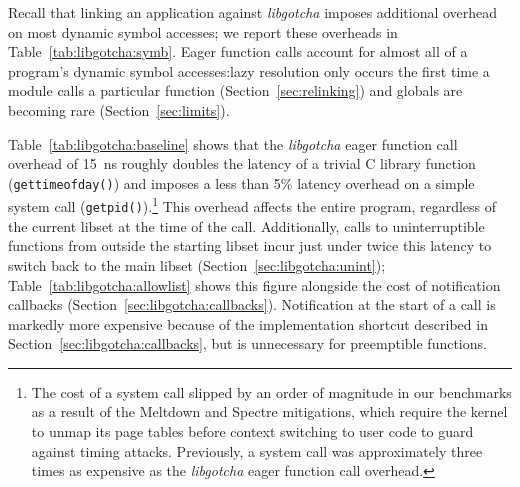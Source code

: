 Recall that linking an application against \textit{libgotcha} imposes additional
overhead on most dynamic symbol accesses; we report these overheads in
Table~\ref{tab:libgotcha:symb}.  Eager function calls account for almost all of a
program's dynamic symbol accesses:\@ lazy resolution only occurs the first
time a module calls a particular function (Section~\ref{sec:relinking}) and globals
are becoming rare (Section~\ref{sec:limits}).

Table~\ref{tab:libgotcha:baseline} shows that the \textit{libgotcha} eager function
call overhead of 15~ns roughly doubles the latency of a trivial C library function
(\texttt{gettimeofday()}) and imposes a less than 5\% latency overhead
on a simple system call (\texttt{getpid()}).\footnote{The cost of a system call
slipped by an order of magnitude in our benchmarks as a result of the Meltdown and
Spectre mitigations, which require the kernel to unmap its page tables before context
switching to user code to guard against timing attacks.  Previously, a system call
was approximately three times as expensive as the \textit{libgotcha} eager function
call overhead.}  This overhead affects the entire program, regardless of the
current libset at the time of the call.  Additionally, calls to
uninterruptible functions from outside the starting libset incur just under twice
this latency to switch back to the main libset
(Section~\ref{sec:libgotcha:unint}); Table~\ref{tab:libgotcha:allowlist} shows this
figure alongside the cost of notification callbacks
(Section~\ref{sec:libgotcha:callbacks}).  Notification at the start of a call is
markedly more expensive because of the implementation shortcut described in
Section~\ref{sec:libgotcha:callbacks}, but is unnecessary for preemptible functions.

